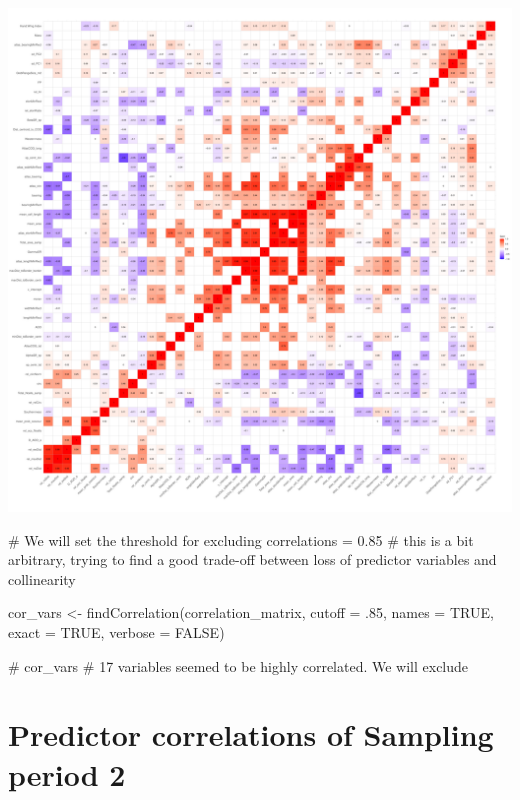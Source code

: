 \documentclass[
  letterpaper,
  DIV=11,
  numbers=noendperiod]{scrreprt}
\newenvironment{Shaded}{\begin{snugshade}}{\end{snugshade}}
\newcommand{\AttributeTok}[1]{\textcolor[rgb]{0.40,0.45,0.13}{#1}}
\newcommand{\CommentTok}[1]{\textcolor[rgb]{0.37,0.37,0.37}{#1}}
\newcommand{\ConstantTok}[1]{\textcolor[rgb]{0.56,0.35,0.01}{#1}}
\newcommand{\DecValTok}[1]{\textcolor[rgb]{0.68,0.00,0.00}{#1}}
\newcommand{\FunctionTok}[1]{\textcolor[rgb]{0.28,0.35,0.67}{#1}}
\newcommand{\NormalTok}[1]{\textcolor[rgb]{0.00,0.23,0.31}{#1}}
\newcommand{\OtherTok}[1]{\textcolor[rgb]{0.00,0.23,0.31}{#1}}
\begin{document}
\includegraphics{01_DataPrep_files/figure-pdf/correlation-matrix-J1-1.pdf}

\begin{Shaded}
\begin{Highlighting}[]
\CommentTok{\# We will set the threshold for excluding correlations = 0.85}
\CommentTok{\# this is a bit arbitrary, trying to find a good trade{-}off between loss of predictor variables and collinearity}

\NormalTok{cor\_vars }\OtherTok{\textless{}{-}} \FunctionTok{findCorrelation}\NormalTok{(correlation\_matrix,}
    \AttributeTok{cutoff =}\NormalTok{ .}\DecValTok{85}\NormalTok{,}
    \AttributeTok{names =} \ConstantTok{TRUE}\NormalTok{,}
    \AttributeTok{exact =} \ConstantTok{TRUE}\NormalTok{,}
    \AttributeTok{verbose =} \ConstantTok{FALSE}\NormalTok{)}

\CommentTok{\# cor\_vars \# 17 variables seemed to be highly correlated. We will exclude}
\end{Highlighting}
\end{Shaded}

\section{Predictor correlations of Sampling period 2}
\end{document}
